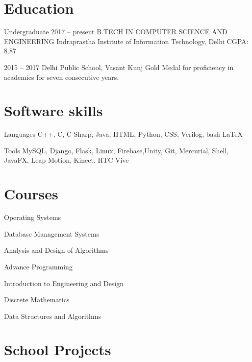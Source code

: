 \documentclass{tccv}
\begin{document}
\section{Education}

\begin{yearlist}

\item[Undergraduate]{2017 -- present }
     {B.TECH IN COMPUTER SCIENCE
AND ENGINEERING }
     {Indraprastha Institute of Information Technology, Delhi
     CGPA: 8.87}

\item{2015 -- 2017}
     {Delhi Public School, Vasant Kunj}
     {Gold Medal for proficiency in academics for seven consecutive years.}

\end{yearlist}

\section{Software skills}

\begin{factlist}

\item{Languages}
     {C++, C, C Sharp, Java, HTML, Python, CSS, Verilog, bash
       \LaTeX}

\item{Tools}
     {MySQL, Django, Flask, Linux, Firebase,Unity, Git, Mercurial, Shell, JavaFX, Leap Motion, Kinect, HTC Vive}


\end{factlist}
\section{Courses}
\begin{factlist}
\item{Operating Systems}{}
\item{Database Management Systems}{}
\item{Analysis and Design of Algorithms}{}

\item{Advance Programming}{}
\item{Introduction to Engineering and Design}{}
\item{Discrete Mathematics}{}
\item{Data Structures and Algorithms}{}

\end{factlist}

\section{School Projects}
\end{document}
